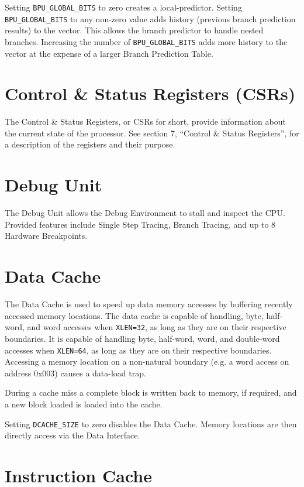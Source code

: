 Setting \texttt{BPU\_GLOBAL\_BITS} to zero creates a local-predictor. Setting
\texttt{BPU\_GLOBAL\_BITS} to any non-zero value adds history (previous branch
prediction results) to the vector. This allows the branch predictor to
handle nested branches. Increasing the number of \texttt{BPU\_GLOBAL\_BITS} adds
more history to the vector at the expense of a larger Branch Prediction
Table.

\section{Control \& Status Registers (CSRs)} \label{control-status-registers-csrs}

The Control \& Status Registers, or CSRs for short, provide information
about the current state of the processor. See section 7, ``Control \&
Status Registers'', for a description of the registers and their
purpose.

\section{Debug Unit} \label{debug-unit}

The Debug Unit allows the Debug Environment to stall and inspect the
CPU. Provided features include Single Step Tracing, Branch Tracing, and
up to 8 Hardware Breakpoints.

\section{Data Cache} \label{data-cache}

The Data Cache is used to speed up data memory accesses by buffering
recently accessed memory locations. The data cache is capable of
handling, byte, half-word, and word accesses when \texttt{XLEN=32}, as long as
they are on their respective boundaries. It is capable of handling byte,
half-word, word, and double-word accesses when \texttt{XLEN=64}, as long as they
are on their respective boundaries. Accessing a memory location on a
non-natural boundary (e.g. a word access on address 0x003) causes a
data-load trap.

During a cache miss a complete block is written back to memory, if
required, and a new block loaded is loaded into the cache.

Setting \texttt{DCACHE\_SIZE} to zero disables the Data Cache. Memory locations
are then directly access via the Data Interface.

\section{Instruction Cache}\label{instruction-cache}

